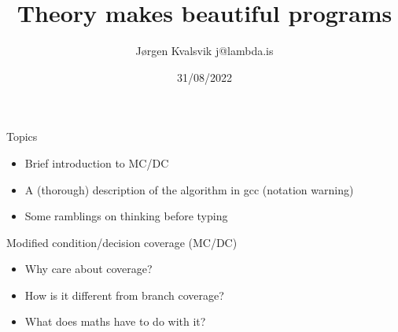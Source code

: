 \documentclass[xcolor = {dvipsnames, table}]{beamer}
\title{Theory makes beautiful programs}
\author{Jørgen Kvalsvik j@lambda.is}
\date{31/08/2022}
\begin{document}
\frame{\titlepage}

\begin{frame}
    \begin{block}{Topics}
        \begin{itemize}
            \item Brief introduction to MC/DC
            \item A (thorough) description of the algorithm in gcc (notation warning)
            \item Some ramblings on thinking before typing
        \end{itemize}
    \end{block}
\end{frame}

\begin{frame}
    Modified condition/decision coverage (MC/DC)

    \begin{itemize}
        \item Why care about coverage?
        \item How is it different from branch coverage?
        \item What does maths have to do with it?
    \end{itemize}
\end{frame}
\end{document}

